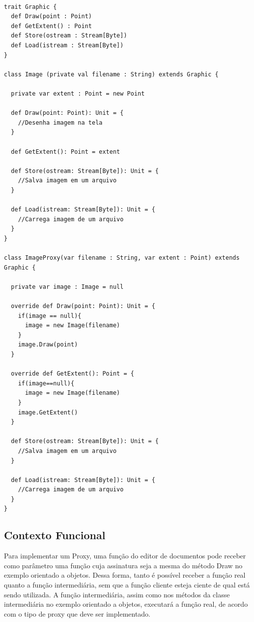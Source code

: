 \begin{lstlisting}[caption={Proxy Orientado a Objetos.},label=ooproxy]

trait Graphic {
  def Draw(point : Point)
  def GetExtent() : Point
  def Store(ostream : Stream[Byte])
  def Load(istream : Stream[Byte])
}

class Image (private val filename : String) extends Graphic {

  private var extent : Point = new Point

  def Draw(point: Point): Unit = {
    //Desenha imagem na tela
  }

  def GetExtent(): Point = extent

  def Store(ostream: Stream[Byte]): Unit = {
    //Salva imagem em um arquivo
  }

  def Load(istream: Stream[Byte]): Unit = {
    //Carrega imagem de um arquivo
  }
}

class ImageProxy(var filename : String, var extent : Point) extends Graphic {

  private var image : Image = null

  override def Draw(point: Point): Unit = {
    if(image == null){
      image = new Image(filename)
    }
    image.Draw(point)
  }

  override def GetExtent(): Point = {
    if(image==null){
      image = new Image(filename)
    }
    image.GetExtent()
  }

  def Store(ostream: Stream[Byte]): Unit = {
    //Salva imagem em um arquivo
  }

  def Load(istream: Stream[Byte]): Unit = {
    //Carrega imagem de um arquivo
  }
}

\end{lstlisting}

\subsection*{Contexto Funcional}

Para implementar um Proxy, uma função do 
editor de documentos pode receber como 
parâmetro uma função cuja assinatura seja 
a mesma do método Draw no exemplo orientado 
a objetos. Dessa forma, tanto é possível 
receber a função real quanto a função 
intermediária, sem que a função cliente 
esteja ciente de qual está sendo utilizada. 
A função intermediária, assim como nos 
métodos da classe intermediária no exemplo 
orientado a objetos, executará a função 
real, de acordo com o tipo de proxy que 
deve ser implementado. 

